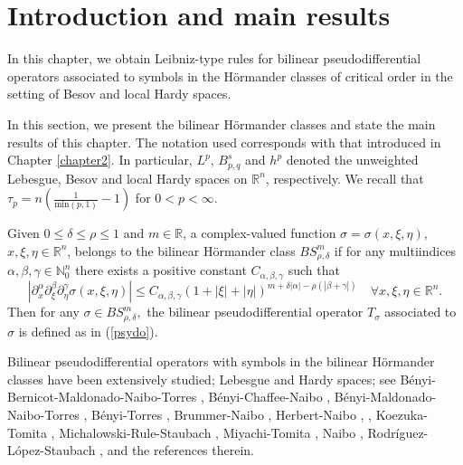 \documentclass[final,letterpaper,12pt,oneside]{class_diss}
\theoremstyle{remark}
\newcommand{\re}{\mathbb{R}}
\newcommand{\rn}{{{\mathbb R}^n}}
\newcommand{\abs}[1]{\left\vert #1 \right\vert}
\begin{document}
\section{Introduction and main results}

In this chapter, we obtain Leibniz-type rules for bilinear pseudodifferential operators associated to symbols in the H\"ormander classes of critical order in the setting of Besov and local Hardy spaces. 

In this section, we present the bilinear H\"ormander classes and state the main results of this chapter. The notation used corresponds with that introduced in Chapter \ref{chapter2}. In particular, $L^p$, $B^s_{p,q}$ and $h^p$ denoted the unweighted Lebesgue, Besov and local Hardy spaces on $\rn$, respectively. We recall that $\tau_p = n(\frac{1}{\text{min}(p,1)} - 1)$ for $0<p<\infty$. 

Given $0\leq \delta \leq \rho \leq 1$ and $m\in\re$, a complex-valued function $\sigma = \sigma(x,\xi,\eta)$, $x,\xi,\eta \in \rn$, belongs to the bilinear H\"ormander class $BS^m_{\rho,\delta}$ if for any multiindices $\alpha,\beta,\gamma \in \mathbb{N}^n_0$ there exists a positive constant $C_{\alpha,\beta,\gamma}$ such that 
\begin{equation}\label{def:Bmrd}
|\partial_x^\alpha \partial_\xi^\beta \partial_\eta^\gamma \sigma(x, \xi, \eta)| \leq C_{\alpha, \beta, \gamma} (1+|\xi|+|\eta|)^{m +\delta \abs{\alpha}-\rho(\abs{\beta+\gamma})} \quad \forall x, \xi, \eta \in \rn.
\end{equation}
Then for any $\sigma \in BS^m_{\rho,\delta},$ the bilinear pseudodifferential operator $T_\sigma$ associated to $\sigma$ is defined as in (\ref{psydo}). 

Bilinear pseudodifferential operators with symbols
in the bilinear H\"ormander classes have been extensively studied;
Lebesgue and Hardy spaces; see B\'enyi-Bernicot-Maldonado-Naibo-Torres \citep{MR3205530}, B\'enyi-Chaffee-Naibo \citep{benyi2018strongly}, B\'enyi-Maldonado-Naibo-Torres \citep{MR2660466}, B\'enyi-Torres \citep{MR1986065; MR2046194}, Brummer-Naibo \citep{MR3750234}, Herbert-Naibo \citep{ MR3211086 ; MR3627725}, \citep{MR3211086}, Koezuka-Tomita \citep{MR3750316}, Michalowski-Rule-Staubach \citep{MR3165300}, Miyachi-Tomita
\citep{MR3179688; MT1; MT2}, Naibo \cite{MR3393696, MR3411149}, Rodr\'iguez-L\'opez-Staubach \citep{MR3035059}, and the references therein.
 
\end{document}
